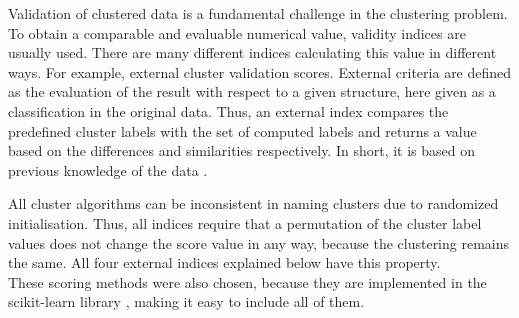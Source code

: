 Validation of clustered data is a fundamental challenge in the clustering problem. To obtain a comparable and evaluable numerical value, validity indices are usually used. There are many different indices calculating this value in different ways. For example, external cluster validation scores. External criteria are defined as the evaluation of the result with respect to a given structure, here given as a classification in the original data. Thus, an external index compares the predefined cluster labels with the set of computed labels and returns a value based on the differences and similarities respectively. In short, it is based on previous knowledge of the data \cite{int_ext}.

All cluster algorithms can be inconsistent in naming clusters due to randomized initialisation. Thus, all indices require that a permutation of the cluster label values does not change the score value in any way, because the clustering remains the same. All four external indices explained below have this property.\\
These scoring methods were also chosen, because they are implemented in the scikit-learn library \cite{scikitlearn}, making it easy to include all of them.